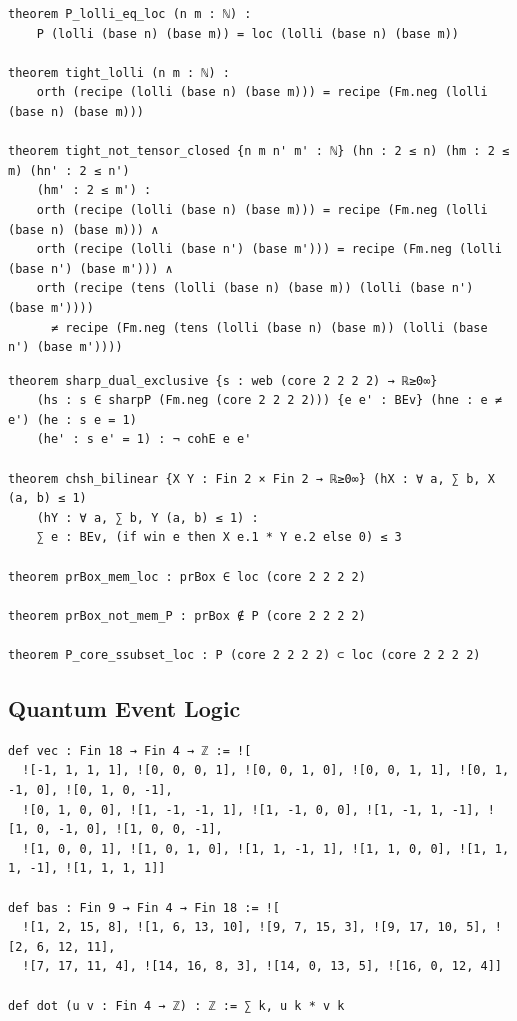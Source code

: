 \label{lean:tight-tensor}
\begin{lstlisting}
theorem P_lolli_eq_loc (n m : ℕ) :
    P (lolli (base n) (base m)) = loc (lolli (base n) (base m))

theorem tight_lolli (n m : ℕ) :
    orth (recipe (lolli (base n) (base m))) = recipe (Fm.neg (lolli (base n) (base m)))

theorem tight_not_tensor_closed {n m n' m' : ℕ} (hn : 2 ≤ n) (hm : 2 ≤ m) (hn' : 2 ≤ n')
    (hm' : 2 ≤ m') :
    orth (recipe (lolli (base n) (base m))) = recipe (Fm.neg (lolli (base n) (base m))) ∧
    orth (recipe (lolli (base n') (base m'))) = recipe (Fm.neg (lolli (base n') (base m'))) ∧
    orth (recipe (tens (lolli (base n) (base m)) (lolli (base n') (base m'))))
      ≠ recipe (Fm.neg (tens (lolli (base n) (base m)) (lolli (base n') (base m'))))
\end{lstlisting}

\label{lean:bell}
\begin{lstlisting}
theorem sharp_dual_exclusive {s : web (core 2 2 2 2) → ℝ≥0∞}
    (hs : s ∈ sharpP (Fm.neg (core 2 2 2 2))) {e e' : BEv} (hne : e ≠ e') (he : s e = 1)
    (he' : s e' = 1) : ¬ cohE e e'

theorem chsh_bilinear {X Y : Fin 2 × Fin 2 → ℝ≥0∞} (hX : ∀ a, ∑ b, X (a, b) ≤ 1)
    (hY : ∀ a, ∑ b, Y (a, b) ≤ 1) :
    ∑ e : BEv, (if win e then X e.1 * Y e.2 else 0) ≤ 3

theorem prBox_mem_loc : prBox ∈ loc (core 2 2 2 2)

theorem prBox_not_mem_P : prBox ∉ P (core 2 2 2 2)

theorem P_core_ssubset_loc : P (core 2 2 2 2) ⊂ loc (core 2 2 2 2)
\end{lstlisting}

\subsection{Quantum Event Logic}

\label{lean:cabello-set}
\begin{lstlisting}
def vec : Fin 18 → Fin 4 → ℤ := ![
  ![-1, 1, 1, 1], ![0, 0, 0, 1], ![0, 0, 1, 0], ![0, 0, 1, 1], ![0, 1, -1, 0], ![0, 1, 0, -1],
  ![0, 1, 0, 0], ![1, -1, -1, 1], ![1, -1, 0, 0], ![1, -1, 1, -1], ![1, 0, -1, 0], ![1, 0, 0, -1],
  ![1, 0, 0, 1], ![1, 0, 1, 0], ![1, 1, -1, 1], ![1, 1, 0, 0], ![1, 1, 1, -1], ![1, 1, 1, 1]]

def bas : Fin 9 → Fin 4 → Fin 18 := ![
  ![1, 2, 15, 8], ![1, 6, 13, 10], ![9, 7, 15, 3], ![9, 17, 10, 5], ![2, 6, 12, 11],
  ![7, 17, 11, 4], ![14, 16, 8, 3], ![14, 0, 13, 5], ![16, 0, 12, 4]]

def dot (u v : Fin 4 → ℤ) : ℤ := ∑ k, u k * v k
\end{lstlisting}

